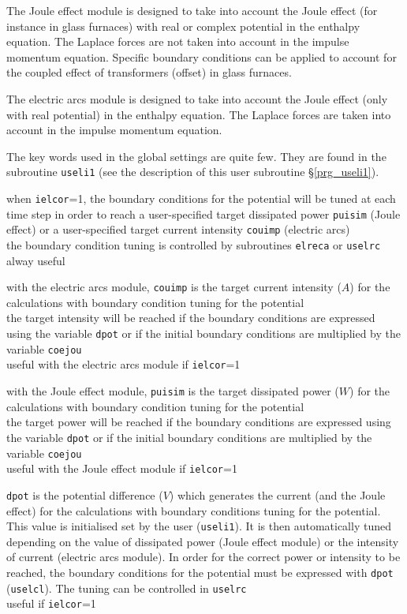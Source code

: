 The Joule effect module is designed to take into account the Joule effect
(for instance in glass furnaces) with real or complex potential in the
enthalpy equation. The Laplace forces are not taken into account in the
impulse momentum equation. Specific boundary conditions can be applied to
account for the coupled effect of transformers (offset) in glass furnaces.

The electric arcs module is designed to take into account the Joule effect
(only with real potential) in the enthalpy equation. The Laplace forces
are taken into account in the impulse momentum equation.

The key words used in the global settings are quite few. They are
found in the subroutine \texttt{useli1} (see the description of this
user subroutine \S\ref{prg_useli1}).

{when \texttt{ielcor}=1, the boundary conditions for the potential will be
tuned at each time step in order to reach a user-specified target dissipated
power \texttt{puisim} (Joule effect) or a user-specified target current
intensity \texttt{couimp} (electric arcs)\\
the boundary condition tuning is controlled by subroutines \texttt{elreca} or
\texttt{uselrc}\\
alway useful}

{with the electric arcs module, \texttt{couimp} is the target current intensity ($A$)
for the calculations with boundary condition tuning for the potential\\
the target intensity will be reached if the boundary conditions are expressed
using the variable \texttt{dpot} or if the initial boundary conditions are multiplied by
the variable \texttt{coejou}\\
useful with the electric arcs module if \texttt{ielcor}=1}

{with the Joule effect module, \texttt{puisim} is the target dissipated power ($W$)
for the calculations with boundary condition tuning for the potential\\
the target power will be reached if the boundary conditions are expressed
using the variable \texttt{dpot} or if the initial boundary conditions are multiplied by
the variable \texttt{coejou}\\
useful with the Joule effect module if \texttt{ielcor}=1}

{\texttt{dpot} is the potential difference ($V$) which generates the current (and the Joule effect) for the
calculations with boundary conditions tuning for the potential. This value is
initialised set by the user (\texttt{useli1}). It is then automatically tuned
depending on the value of dissipated power (Joule effect module) or the
intensity of current (electric arcs module).
In order for the correct power or intensity to be reached, the boundary
conditions for the potential must be expressed with \texttt{dpot}
(\texttt{uselcl}). The tuning can be controlled in \texttt{uselrc}\\
useful if \texttt{ielcor}=1}

